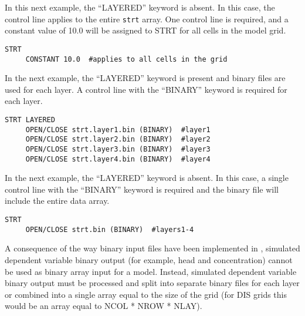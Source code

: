 In this next example, the ``LAYERED'' keyword is absent.  In this case, the control line applies to the entire \texttt{strt} array.  One control line is required, and a constant value of 10.0 will be assigned to STRT for all cells in the model grid.

\begin{lstlisting}[style=inputfile]
  STRT
     CONSTANT 10.0  #applies to all cells in the grid
\end{lstlisting}

In the next example, the ``LAYERED'' keyword is present and binary files are used for each layer. A control line with the ``BINARY'' keyword is required for each layer.

\begin{lstlisting}[style=inputfile]
  STRT LAYERED
     OPEN/CLOSE strt.layer1.bin (BINARY)  #layer1
     OPEN/CLOSE strt.layer2.bin (BINARY)  #layer2
     OPEN/CLOSE strt.layer3.bin (BINARY)  #layer3
     OPEN/CLOSE strt.layer4.bin (BINARY)  #layer4
\end{lstlisting}

In the next example, the ``LAYERED'' keyword is absent. In this case, a single control line with the ``BINARY'' keyword is required and the binary file will include the entire data array.

\begin{lstlisting}[style=inputfile]
  STRT
     OPEN/CLOSE strt.bin (BINARY)  #layers1-4
\end{lstlisting}

A consequence of the way binary input files have been implemented in \mf, simulated dependent variable binary output (for example, head and concentration) cannot be used as binary array input for a model. Instead, simulated dependent variable binary output must be processed and split into separate binary files for each layer or combined into a single array equal to the size of the grid (for DIS grids this would be an array equal to NCOL * NROW * NLAY).
